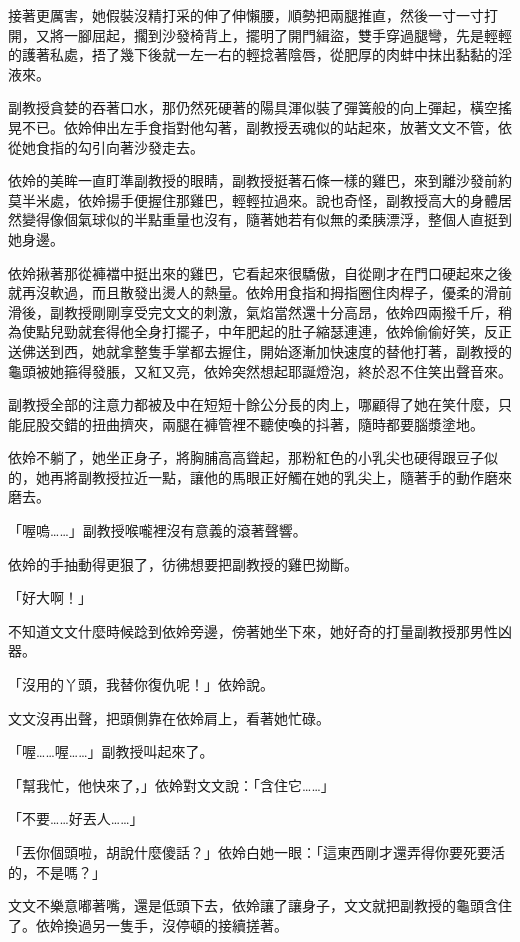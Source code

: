 接著更厲害，她假裝沒精打采的伸了伸懶腰，順勢把兩腿推直，然後一寸一寸打開，又將一腳屈起，擱到沙發椅背上，擺明了開門緝盜，雙手穿過腿彎，先是輕輕的護著私處，捂了幾下後就一左一右的輕捻著陰唇，從肥厚的肉蚌中抹出黏黏的淫液來。

副教授貪婪的吞著口水，那仍然死硬著的陽具渾似裝了彈簧般的向上彈起，橫空搖晃不已。依姈伸出左手食指對他勾著，副教授丟魂似的站起來，放著文文不管，依從她食指的勾引向著沙發走去。

依姈的美眸一直盯準副教授的眼睛，副教授挺著石條一樣的雞巴，來到離沙發前約莫半米處，依姈揚手便握住那雞巴，輕輕拉過來。說也奇怪，副教授高大的身體居然變得像個氣球似的半點重量也沒有，隨著她若有似無的柔胰漂浮，整個人直挺到她身邊。

依姈揪著那從褲襠中挺出來的雞巴，它看起來很驕傲，自從剛才在門口硬起來之後就再沒軟過，而且散發出燙人的熱量。依姈用食指和拇指圈住肉桿子，優柔的滑前滑後，副教授剛剛享受完文文的刺激，氣焰當然還十分高昂，依姈四兩撥千斤，稍為使點兒勁就套得他全身打擺子，中年肥起的肚子縮瑟連連，依姈偷偷好笑，反正送佛送到西，她就拿整隻手掌都去握住，開始逐漸加快速度的替他打著，副教授的龜頭被她箍得發脹，又紅又亮，依姈突然想起耶誕燈泡，終於忍不住笑出聲音來。

副教授全部的注意力都被及中在短短十餘公分長的肉上，哪顧得了她在笑什麼，只能屁股交錯的扭曲擠夾，兩腿在褲管裡不聽使喚的抖著，隨時都要腦漿塗地。

依姈不躺了，她坐正身子，將胸脯高高聳起，那粉紅色的小乳尖也硬得跟豆子似的，她再將副教授拉近一點，讓他的馬眼正好觸在她的乳尖上，隨著手的動作磨來磨去。

「喔嗚……」副教授喉嚨裡沒有意義的滾著聲響。

依姈的手抽動得更狠了，彷彿想要把副教授的雞巴拗斷。

「好大啊！」

不知道文文什麼時候踗到依姈旁邊，傍著她坐下來，她好奇的打量副教授那男性凶器。

「沒用的丫頭，我替你復仇呢！」依姈說。

文文沒再出聲，把頭側靠在依姈肩上，看著她忙碌。

「喔……喔……」副教授叫起來了。

「幫我忙，他快來了，」依姈對文文說：「含住它……」

「不要……好丟人……」

「丟你個頭啦，胡說什麼傻話？」依姈白她一眼：「這東西剛才還弄得你要死要活的，不是嗎？」

文文不樂意嘟著嘴，還是低頭下去，依姈讓了讓身子，文文就把副教授的龜頭含住了。依姈換過另一隻手，沒停頓的接續搓著。


